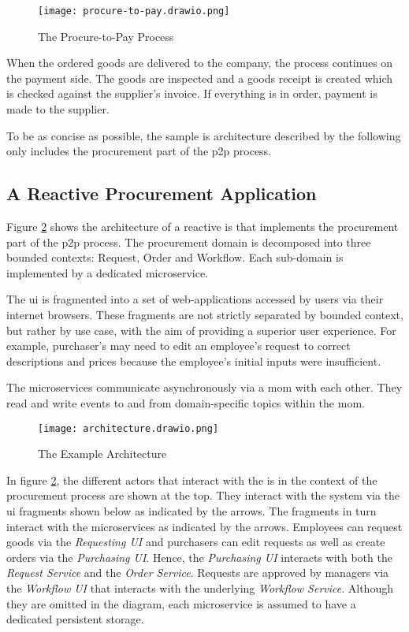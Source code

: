 \begin{figure}[h]
  \centering
  \texttt{[image: procure-to-pay.drawio.png]}
  \caption{The Procure-to-Pay Process}\label{fig:procure-to-pay}
\end{figure}

When the ordered goods are delivered to the company, the process continues on the payment side.
The goods are inspected and a goods receipt is created which is checked against the supplier's invoice.
If everything is in order, payment is made to the supplier.

To be as concise as possible, the sample \gls{is} architecture described by the following only includes the procurement part of the \gls{p2p} process.

\subsection{A Reactive Procurement Application}

Figure \ref{fig:example-architecture} shows the architecture of a reactive \gls{is} that implements the procurement part of the \gls{p2p} process.
The procurement domain is decomposed into three bounded contexts: Request, Order and Workflow.
Each sub-domain is implemented by a dedicated microservice.

The \gls{ui} is fragmented into a set of web-applications accessed by users via their internet browsers.
These fragments are not strictly separated by bounded context, but rather by use case, with the aim of providing a superior user experience.
For example, purchaser's may need to edit an employee's request to correct descriptions and prices because the employee's initial inputs were insufficient.

The microservices communicate asynchronously via a \gls{mom} with each other.
They read and write events to and from domain-specific topics within the \gls{mom}.

\begin{figure}[H]
  \centering
  \texttt{[image: architecture.drawio.png]}
  \caption{The Example Architecture}\label{fig:example-architecture}
\end{figure}

In figure \ref{fig:example-architecture}, the different actors that interact with the \gls{is} in the context of the procurement process are shown at the top.
They interact with the system via the \gls{ui} fragments shown below as indicated by the arrows.
The fragments in turn interact with the microservices as indicated by the arrows.
Employees can request goods via the \emph{Requesting UI} and purchasers can edit requests as well as create orders via the \emph{Purchasing UI}.
Hence, the \emph{Purchasing UI} interacts with both the \emph{Request Service} and the \emph{Order Service}.
Requests are approved by managers via the \emph{Workflow UI} that interacts with the underlying \emph{Workflow Service}.
Although they are omitted in the diagram, each microservice is assumed to have a dedicated persistent storage.

